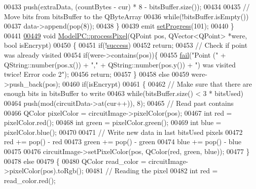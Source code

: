 \begin{DoxyCode}
00433         push(extraData, (countBytes - cur) * 8 - bitsBuffer.size());
00434 
00435         \textcolor{comment}{// Move bits from bitsBuffer to the QByteArray}
00436         \textcolor{keywordflow}{while}(!bitsBuffer.isEmpty())
00437             data->append(pop(8));
00438     \}
00439     emit \hyperlink{class_model_p_c_afdcd80f0ed5062e145a71f09b0897547}{setProgress}(101);
00440 \}
00441 
\hypertarget{modelpc_8cpp_source_l00449}{}\hyperlink{class_model_p_c_a1171f9fe1550133dc9053a46b4e5bcfd}{00449} \textcolor{keywordtype}{void} \hyperlink{class_model_p_c_a1171f9fe1550133dc9053a46b4e5bcfd}{ModelPC::processPixel}(QPoint pos, QVector<QPoint> *were, \textcolor{keywordtype}{bool} isEncrypt)
00450 \{
00451     \textcolor{keywordflow}{if}(!\hyperlink{class_model_p_c_a945ffbbc44a832b953c191debd448f4c}{success})
00452         \textcolor{keywordflow}{return};
00453     \textcolor{comment}{// Check if point was already visited}
00454     \textcolor{keywordflow}{if}(were->contains(pos))\{
00455         \hyperlink{class_model_p_c_a47464b59b7e37fcee25e55475708aabd}{fail}(\textcolor{stringliteral}{"Point ("} + QString::number(pos.x()) + \textcolor{stringliteral}{","} + QString::number(pos.y()) + \textcolor{stringliteral}{") was visited
       twice! Error code 2"});
00456         \textcolor{keywordflow}{return};
00457     \}
00458     \textcolor{keywordflow}{else}
00459         were->push\_back(pos);
00460     \textcolor{keywordflow}{if}(isEncrypt)
00461     \{
00462         \textcolor{comment}{// Make sure that there are enough bits in bitsBuffer to write}
00463         \textcolor{keywordflow}{while}(bitsBuffer.size() < 3 * bitsUsed)
00464             push(mod(circuitData->at(cur++)), 8);
00465         \textcolor{comment}{// Read past contains}
00466         QColor pixelColor = circuitImage->pixelColor(pos);
00467         \textcolor{keywordtype}{int} red = pixelColor.red();
00468         \textcolor{keywordtype}{int} green = pixelColor.green();
00469         \textcolor{keywordtype}{int} blue = pixelColor.blue();
00470 
00471         \textcolor{comment}{// Write new data in last bitsUsed pixels}
00472         red += pop() - red %
00473         green += pop() - green %
00474         blue += pop() - blue %
00475 
00476         circuitImage->setPixelColor(pos, QColor(red, green, blue));
00477     \}
00478     \textcolor{keywordflow}{else}
00479     \{
00480         QColor read\_color = circuitImage->pixelColor(pos).toRgb();
00481         \textcolor{comment}{// Reading the pixel}
00482         \textcolor{keywordtype}{int} red = read\_color.red();

\end{DoxyCode}
